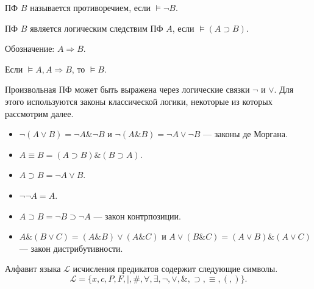     \begin{Def}[Противоречие]
        ПФ $B$ называется противоречием, если $\models \neg B$.
    \end{Def}

    \begin{Def}
        ПФ $B$ является логическим следствим ПФ $A$, если $\models (A \supset B)$.
    \end{Def}

    \begin{Rem}
        Обозначение: $A \Rightarrow B$.
    \end{Rem}

    \begin{Thm}[О тавтологии]
        Если $\models A, A \Rightarrow B$, то $\models B$.
    \end{Thm}

    \begin{Rem}
        Произвольная ПФ может быть выражена через логические связки $\neg$ и $\vee$. Для этого используются законы классической логики, некоторые из которых рассмотрим далее.
        \begin{itemize}
            \item $\neg (A \vee B) = \neg A \& \neg B$ и $\neg (A \& B) = \neg A \vee \neg B$ --- законы де Моргана.
            \item $A \equiv B = (A \supset B) \& (B \supset A)$.
            \item $A \supset B = \neg A \vee B$.
            \item $\neg \neg A = A$.
            \item $A \supset B = \neg B \supset \neg A$ --- закон контрпозиции.
            \item $A \& (B \vee C) = (A \& B) \vee (A \& C)$ и $A \vee (B \& C) = (A \vee B) \& (A \vee C)$ --- закон дистрибутивности.
        \end{itemize}
    \end{Rem}


    \begin{Def}
        Алфавит языка $\mathcal{L}$ исчисления предикатов содержит следующие символы.
        $$\mathcal{L} = \{ x,c, P, F, |, \#, \forall, \exists, \neg, \vee, \&, \supset, \equiv, (, ) \}.$$
    \end{Def}

